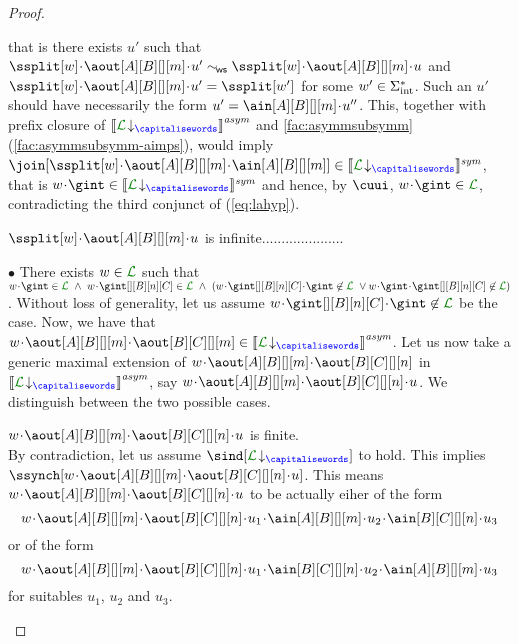 \begin{proof}
\begin{description}
 that is there exists $u'$ such that
 $\ssplit[{\acword}]\cat\aout[A][B][][m]\cat u' \commds \ssplit[{\acword}]\cat\aout[A][B][][m]\cat u$ and $\ssplit[{\acword}]\cat\aout[A][B][][m]\cat u' = \ssplit[\acword']$ for some $w'\in\Sigma_{\text{int}}^*$.
Such an $u'$ should have necessarily the form $u'=\ain[A][B][][m]\cat u''$.
 This, together with prefix closure of $\asem{\proj{\clang}{}}$
 and \cref{fac:asymmsubsymm}(\ref{fac:asymmsubsymm-aimps}), would imply
$\join[{\ssplit[{\acword}]\cat\aout[A][B][][m]\cat \ain[A][B][][m]}]\in\ssem{\proj{\clang}{}}$,
that is $\acword\cat\gint\in\ssem{\proj{\clang}{}}$ and hence, by $\cuui$,
$\acword\cat\gint\in{{\clang}}$, contradicting the third conjunct of (\ref{eq:lahyp}).
%
\item
$\ssplit[{\acword}]\cat\aout[A][B][][m]\cat u$ is infinite.....................\\ 
\end{description}
$\bullet$ There exists $\acword\in\clang$ such that \\
$\acword\cat\gint\in\clang\ \land\ \acword\cat\gint[][B][n][C]\in\clang\   \land\
 (\acword\cat\gint[][B][n][C]\cat\gint\not\in\clang\ \vee \acword\cat\gint\cat\gint[][B][n][C]\not\in\clang)$.
 Without loss of generality, let us assume $\acword\cat\gint[][B][n][C]\cat\gint\not\in\clang$
 be the case.
Now, 
we have that $\acword\cat\aout[A][B][][m]\cat\aout[B][C][][m]\in\asem{\proj{\clang}{}}$.
Let us now take a generic maximal extension  of $\acword\cat\aout[A][B][][m]\cat\aout[B][C][][n]$
in $\asem{\proj{\clang}{}}$, say  $\acword\cat\aout[A][B][][m]\cat\aout[B][C][][n]\cat u$. We distinguish between the two possible cases.
\begin{description}
\item
$\acword\cat\aout[A][B][][m]\cat\aout[B][C][][n]\cat u$ is finite.\\
By contradiction, let us assume $\sind[\proj{\clang}{}]$ to hold. 
This implies $\ssynch[{\acword\cat\aout[A][B][][m]\cat\aout[B][C][][n]\cat u}]$.
This means  $\acword\cat\aout[A][B][][m]\cat\aout[B][C][][n]\cat u$  to be actually
eiher of the form  
$$\acword\cat\aout[A][B][][m]\cat\aout[B][C][][n]\cat u_1\cat\ain[A][B][][m]\cat u_2\cat\ain[B][C][][n]\cat u_3$$
or of the form
$$\acword\cat\aout[A][B][][m]\cat\aout[B][C][][n]\cat u_1\cat\ain[B][C][][n]\cat u_2\cat\ain[A][B][][m]\cat u_3$$
for suitables $u_1$, $u_2$ and $u_3$.


\end{description}
\end{proof}
